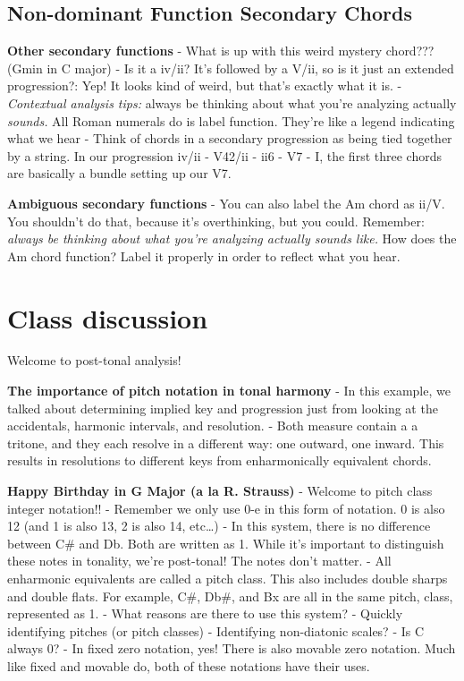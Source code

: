 \documentclass{book}
\begin{document}
\hypertarget{non-dominant-function-secondary-chords}{%
\section{Non-dominant Function Secondary
Chords}\label{non-dominant-function-secondary-chords}}

\textbf{Other secondary functions} - What is up with this weird mystery
chord??? (Gmin in C major) - Is it a iv/ii? It's followed by a V/ii, so is it
just an extended progression?: Yep! It looks kind of weird, but that's exactly
what it is. - \emph{Contextual analysis tips:} always be thinking about what
you're analyzing actually \emph{sounds.} All Roman numerals do is label
function. They're like a legend indicating what we hear - Think of chords in a
secondary progression as being tied together by a string. In our progression
iv/ii - V42/ii - ii6 - V7 - I, the first three chords are basically a bundle
setting up our V7.

\textbf{Ambiguous secondary functions} - You can also label the Am chord as
ii/V. You shouldn't do that, because it's overthinking, but you could.
Remember: \emph{always be thinking about what you're analyzing actually sounds
like.} How does the Am chord function? Label it properly in order to reflect
what you hear.

\hypertarget{class-discussion-41}{%
\chapter{Class discussion}\label{class-discussion-41}}

Welcome to post-tonal analysis!

\textbf{The importance of pitch notation in tonal harmony} - In this example,
we talked about determining implied key and progression just from looking at
the accidentals, harmonic intervals, and resolution. - Both measure contain a
a tritone, and they each resolve in a different way: one outward, one inward.
This results in resolutions to different keys from enharmonically equivalent
chords.

\textbf{Happy Birthday in G Major (a la R. Strauss)} - Welcome to pitch class
integer notation!! - Remember we only use 0-e in this form of notation. 0 is
also 12 (and 1 is also 13, 2 is also 14, etc\ldots) - In this system, there is
no difference between C\# and Db. Both are written as 1. While it's important
to distinguish these notes in tonality, we're post-tonal! The notes don't
matter. - All enharmonic equivalents are called a pitch class. This also
includes double sharps and double flats. For example, C\#, Db\#, and Bx are
all in the same pitch, class, represented as 1. - What reasons are there to
use this system? - Quickly identifying pitches (or pitch classes) -
Identifying non-diatonic scales? - Is C always 0? - In fixed zero notation,
yes! There is also movable zero notation. Much like fixed and movable do, both
of these notations have their uses.
\end{document}
